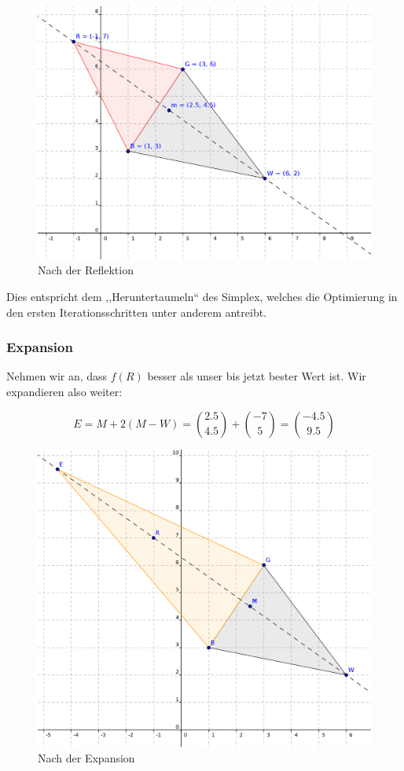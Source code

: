 \documentclass[naustrian]{article}
\begin{document}
\begin{figure}[H]
    \centering
    \includegraphics{nelder_mead/triangle_reflect}
    \caption{Nach der Reflektion}
\end{figure}

Dies entspricht dem ,,Heruntertaumeln`` des Simplex, welches die
Optimierung in den ersten Iterationsschritten unter anderem antreibt.

\subsubsection{Expansion}

Nehmen wir an, dass $f(R)$ besser als unser bis jetzt bester Wert
ist. Wir expandieren also weiter:

\[
    E=M+2(M-W)=\binom{2.5}{4.5}+\binom{-7}{5}=\binom{-4.5}{9.5}
\]

\begin{figure}[H]
    \centering
    \includegraphics{nelder_mead/triangle_expand}
    \caption{Nach der Expansion}
\end{figure}
\end{document}
